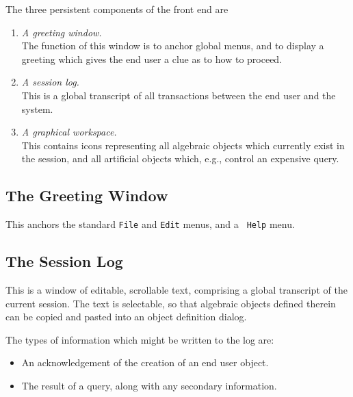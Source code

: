 The three persistent components of the front end are

\begin{enumerate}

\item
{\em A greeting window.}\\
The function of this window is to anchor global menus, and to display
a greeting which gives the end user a clue as to how to proceed.

\item
{\em A session log.}\\
This is a global transcript of all transactions between the end user
and the system.

\item
{\em A graphical workspace.}\\
This contains icons representing all algebraic objects which
currently exist in the session, and all artificial objects which,
e.g., control an expensive query.

\end{enumerate}


\subsection{The Greeting Window}

This anchors the standard {\tt File} and {\tt Edit} menus, and a {\tt
Help} menu.


\subsection{The Session Log}

This is a window of editable, scrollable text, comprising a global
transcript of the current session. The text is selectable, so that
algebraic objects defined therein can be copied and pasted into
an object definition dialog.

The types of information which might be written to the log are:

\begin{itemize}

\item
An acknowledgement of the creation of an end user object.

\item
The result of a query, along with any secondary information.

\end{itemize}


